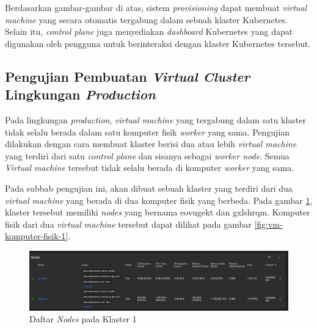 Berdasarkan gambar-gambar di atas, sistem \emph{provisioning} dapat membuat
\emph{virtual machine} yang secara otomatis tergabung dalam sebuah klaster Kubernetes.
Selain itu, \emph{control plane} juga menyediakan \emph{dashboard} Kubernetes yang dapat
digunakan oleh pengguna untuk berinteraksi dengan klaster Kubernetes tersebut.

\subsection{Pengujian Pembuatan \emph{Virtual Cluster} Lingkungan \emph{Production}}
\label{subsec:pengujian-pembuatan-vc-prod}

Pada lingkungan \emph{production}, \emph{virtual machine} yang tergabung dalam
satu klaster tidak selalu berada dalam satu komputer fisik \emph{worker} yang sama.
Pengujian dilakukan dengan cara membuat klaster berisi dua atau lebih \emph{virtual machine}
yang terdiri dari satu \emph{control plane} dan sisanya sebagai \emph{worker node}.
Semua \emph{Virtual machine} tersebut tidak selalu berada di komputer \emph{worker}
yang sama.

Pada subbab pengujian ini, akan dibuat sebuah klaster yang terdiri dari dua
\emph{virtual machine} yang berada di dua komputer fisik yang berbeda. Pada gambar
\ref{fig:nodes-2-komputer-berbeda-1}, klaster tersebut memiliki \emph{nodes} yang
bernama eovugekt dan gxlshrqm. Komputer fisik dari dua \emph{virtual machine}
tersebut dapat dilihat pada gambar \ref{fig:vm-komputer-fisik-1}.

\begin{figure}[H]
  \centering
  \includegraphics[scale=0.3]{gambar/two-nodes-difference-computer-dashboard.png}
  \caption{Daftar \emph{Nodes} pada Klaster 1}
  \label{fig:nodes-2-komputer-berbeda-1}
\end{figure}

